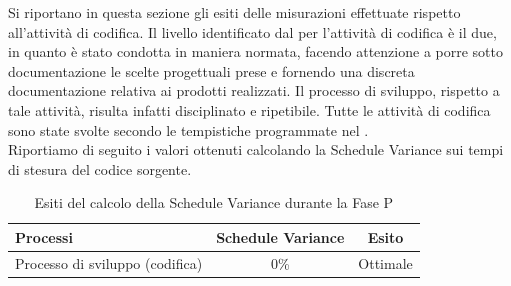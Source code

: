 Si riportano in questa sezione gli esiti delle misurazioni effettuate rispetto all'attività di codifica.
Il livello  identificato dal \groupname{} per l'attività di codifica è il due, in quanto è stato condotta in maniera normata, facendo attenzione a porre sotto documentazione le scelte progettuali prese e fornendo una discreta documentazione relativa ai prodotti realizzati. Il processo di sviluppo, rispetto a tale attività, risulta infatti disciplinato e ripetibile.
Tutte le attività di codifica sono state svolte secondo le tempistiche programmate nel .\\

Riportiamo di seguito i valori ottenuti calcolando la Schedule Variance sui tempi di stesura del codice sorgente.
			\begin{table}[H]
				\centering
				\begin{tabu}{| l | c | c |}
					\hline
						Processi 							& Schedule Variance	& Esito		\\ \hline \hline
						Processo di sviluppo (codifica) & 0\% & Ottimale \\ \hline
				\end{tabu}
				\caption{Esiti del calcolo della Schedule Variance durante la Fase P}
			\end{table}	
			
